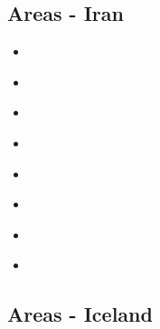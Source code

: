 \subsection{Areas - Iran}

\begin{scriptsize}
\begin{itemize}
\item[\twothousandthree] 
\textcite{bocs03} \\
\item[\twothousandsix] 
\textcite{vech06} \\
\item[\twothousandten] 
\textcite{hamo10} \\
\item[\twothousandeleven] 
\textcite{yakm11} \\
\item[\twothousandthirteen] 
\textcite{nipc13} \\
\item[\twothousandfourteen] 
\textcite{frba14} \\
\item[\twothousandsixteen] 
\textcite{coyc16} \\
\item[\twothousandtwenty] 
\textcite{mofu20} \\
\end{itemize}
\end{scriptsize} 
 

\subsection{Areas - Iceland}

